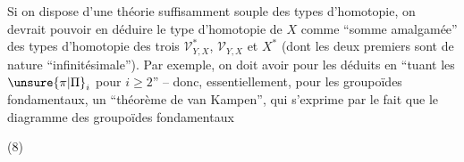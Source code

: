 
Si on dispose d'une théorie suffisamment souple des types d'homotopie, on devrait pouvoir en déduire le type d'homotopie de $X$ comme ``somme amalgamée'' des types d'homotopie des trois  $\mathcal V_{Y,X}^*$, $\mathcal V_{Y,X}$ et $X^*$ (dont les deux premiers sont de nature ``infinitésimale''). Par exemple, on doit avoir pour les  déduits en ``tuant les $\unsure{\pi|\Pi}_i$ pour $i\geq2$'' -- donc, essentiellement, pour les groupoïdes fondamentaux, un ``théorème de van Kampen'', qui s'exprime par le fait que le diagramme des groupoïdes fondamentaux

(8)

